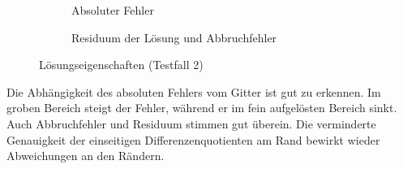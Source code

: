 \begin{figure}[ht]
\centering
   \begin{subfigure}{0.49\linewidth} \centering
     \caption{Absoluter Fehler}
   \end{subfigure}
   \begin{subfigure}{0.49\linewidth} \centering
  \caption{Residuum der Lösung und Abbruchfehler}
   \end{subfigure}
   \caption{Lösungseigenschaften (Testfall 2)}
\end{figure}
\noindent
Die Abhängigkeit des absoluten Fehlers vom Gitter ist gut zu erkennen. Im groben
Bereich steigt der Fehler, während er im fein aufgelösten Bereich sinkt.
Auch Abbruchfehler und Residuum stimmen gut überein. Die verminderte Genauigkeit
der einseitigen Differenzenquotienten am Rand bewirkt wieder Abweichungen an den Rändern.

